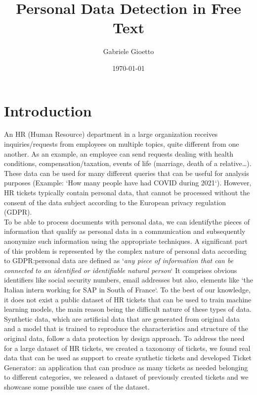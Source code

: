 \documentclass{article}
\title{Personal Data Detection in Free Text }
\author{Gabriele Gioetto}
\date{\today}
\begin{document}
\maketitle

\newpage

\tableofcontents

\newpage

    
    
    

\section{Introduction} 

An HR (Human Resource) department in a large organization receives inquiries\slash requests from employees on multiple topics, quite different from one another. As an example, an employee can send requests dealing with health conditions, compensation/taxation, events of life (marriage, death of a relative\dots). \\
These data can be used for many different queries that can be useful for analysis purposes (Example: `How many people have had COVID during 2021`). However, HR tickets typically contain personal data, that cannot be processed without the consent of the data subject according to the European privacy regulation (GDPR). \\
To be able to process documents with personal data, we can identifythe pieces of information that qualify as personal data in a communication and subsequently anonymize such information using the appropriate techniques.
A significant part of this problem is represented by the complex nature of personal data according to GDPR:\@ personal data are defined as `\textit{any piece of information that can be connected to an identified or identifiable natural person}` It comprises obvious identifiers like social security numbers, email addresses but also, elements like `the Italian intern working for SAP in South of France`.
To the best of our knowledge, it does not exist a public dataset of HR tickets that can be used to train machine learning models, the main reason being the difficult nature of these types of data. Synthetic data, which are artificial data that are generated from original data and a model that is trained to reproduce the characteristics and structure of the original data, follow a data protection by design approach.
To address the need for a large dataset of HR tickets, we created a taxonomy of tickets, we found real data that can be used as support to create synthetic tickets and developed Ticket Generator: an application that can produce as many tickets as needed belonging to different categories, we released a dataset of previously created tickets and we showcase some possible use cases of the dataset.
\end{document}
